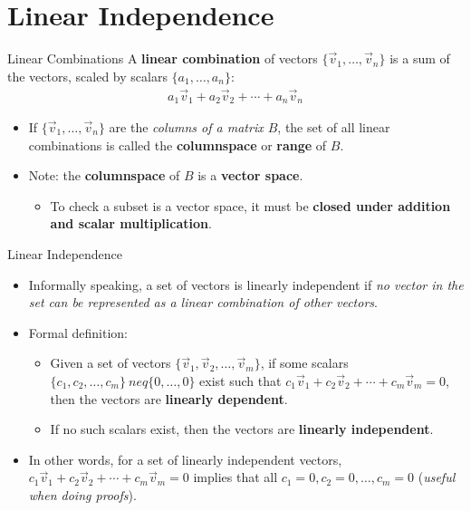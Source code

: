 \section{Linear Independence}

\begin{frame}{Linear Combinations}
    A \textbf{linear combination} of vectors $\{\vec{v}_1, \dots, \vec{v}_n\}$ is a sum of the vectors, scaled by scalars $\{a_1, \dots, a_n\}$:
    \begin{align*}
        a_1 \vec{v}_1 + a_2 \vec{v}_2 + \cdots + a_n \vec{v}_n
    \end{align*}
    \begin{itemize}
        \item If $\{\vec{v}_1, \dots, \vec{v}_n\}$ are the \textit{columns of a matrix $B$}, the set of all linear combinations is called the \textbf{columnspace} or \textbf{range} of $B$.
        \item Note: the \textbf{columnspace} of $B$ is a \textbf{vector space}.
        \begin{itemize}
            \item To check a subset is a vector space, it must be \textbf{closed under addition and scalar multiplication}.
        \end{itemize}
    \end{itemize}
\end{frame}

\begin{frame}{Linear Independence}
    \begin{itemize}
        \item Informally speaking, a set of vectors is linearly independent if \textit{no vector in the set can be represented as a linear combination of other vectors}.
        \item Formal definition:
        \begin{itemize}
            \item Given a set of vectors $\{\vec{v}_1, \vec{v}_2, \dots ,\vec{v}_m\}$, if some scalars $\{c_1, c_2, \dots, c_m\}\ neq \{0, \dots, 0\}$ exist such that 
            $c_1\vec{v}_1 + c_2\vec{v}_2 + \cdots + c_m\vec{v}_m = 0$, then the vectors are \textbf{linearly dependent}. 
            \item If no such scalars exist, then the vectors are \textbf{linearly independent}.
        \end{itemize}
        \item In other words, for a set of linearly independent vectors, $c_1\vec{v}_1 + c_2\vec{v}_2 + \cdots + c_m\vec{v}_m = 0$ implies that all $c_1 = 0, c_2 = 0, \dots , c_m = 0$ (\textit{useful when doing proofs}). 
    \end{itemize}
\end{frame}

